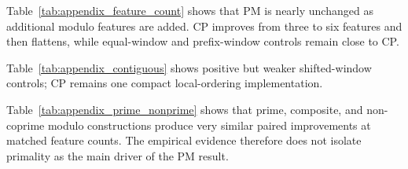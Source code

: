 \documentclass[11pt,a4paper]{article}
\begin{document}
\clearpage

{\renewcommand{\thetable}{D1}
\begin{center}
\label{tab:appendix_feature_count}
\scriptsize
\renewcommand{\arraystretch}{1.08}
\resizebox{0.86\textwidth}{!}{}
\end{center}}

\noindent
Table~\ref{tab:appendix_feature_count} shows that PM is nearly unchanged as additional modulo features are added. CP improves from three to six features and then flattens, while equal-window and prefix-window controls remain close to CP.

{\renewcommand{\thetable}{D2}
\begin{center}
\label{tab:appendix_contiguous}
\scriptsize
\renewcommand{\arraystretch}{1.08}
\resizebox{0.90\textwidth}{!}{}
\end{center}}

\noindent
Table~\ref{tab:appendix_contiguous} shows positive but weaker shifted-window controls; CP remains one compact local-ordering implementation.

{\renewcommand{\thetable}{D3}
\begin{center}
\label{tab:appendix_prime_nonprime}
\scriptsize
\renewcommand{\arraystretch}{1.08}
\resizebox{0.84\textwidth}{!}{}
\end{center}}

\noindent
Table~\ref{tab:appendix_prime_nonprime} shows that prime, composite, and non-coprime modulo constructions produce very similar paired improvements at matched feature counts. The empirical evidence therefore does not isolate primality as the main driver of the PM result.

\clearpage

{\renewcommand{\thetable}{D4}
\begin{center}
\label{tab:appendix_random}
\scriptsize
\renewcommand{\arraystretch}{1.08}
\resizebox{0.88\textwidth}{!}{}
\end{center}}
\end{document}
